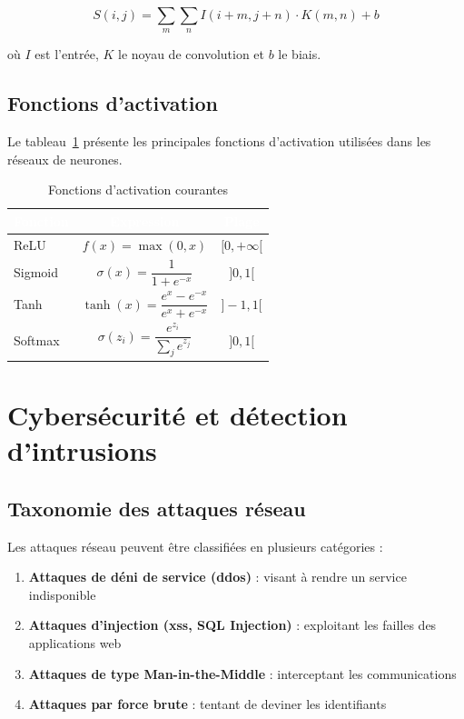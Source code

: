 \begin{equation}
  S(i, j) = \sum_{m} \sum_{n} I(i+m, j+n) \cdot K(m, n) + b
  \label{eq:conv2d}
\end{equation}

où $I$ est l'entrée, $K$ le noyau de convolution et $b$ le biais.

\subsection{Fonctions d'activation}

Le tableau~\ref{tab:activations} présente les principales fonctions d'activation utilisées dans les réseaux de neurones.

\begin{table}[H]
  \centering
  \caption{Fonctions d'activation courantes}
  \label{tab:activations}
  \renewcommand{\arraystretch}{1.5}
  \begin{tabular}{|l|c|c|}
    \hline
    \rowcolor{iacsTableHead}
    \textcolor{white}{\textbf{Fonction}} & 
    \textcolor{white}{\textbf{Expression}} & 
    \textcolor{white}{\textbf{Plage}} \\
    \hline
    ReLU & $f(x) = \max(0, x)$ & $[0, +\infty[$ \\
    \hline
    \rowcolor{iacsLightGray}
    Sigmoid & $\sigma(x) = \dfrac{1}{1 + e^{-x}}$ & $]0, 1[$ \\
    \hline
    Tanh & $\tanh(x) = \dfrac{e^x - e^{-x}}{e^x + e^{-x}}$ & $]-1, 1[$ \\
    \hline
    \rowcolor{iacsLightGray}
    Softmax & $\sigma(z_i) = \dfrac{e^{z_i}}{\sum_{j} e^{z_j}}$ & $]0, 1[$ \\
    \hline
  \end{tabular}
\end{table}

\section{Cybersécurité et détection d'intrusions}
\label{sec:cyber}

\subsection{Taxonomie des attaques réseau}

Les attaques réseau peuvent être classifiées en plusieurs catégories :

\begin{enumerate}
  \item \textbf{Attaques de déni de service (\gls{ddos})} : visant à rendre un service indisponible
  \item \textbf{Attaques d'injection (\gls{xss}, SQL Injection)} : exploitant les failles des applications web
  \item \textbf{Attaques de type Man-in-the-Middle} : interceptant les communications
  \item \textbf{Attaques par force brute} : tentant de deviner les identifiants
\end{enumerate}

